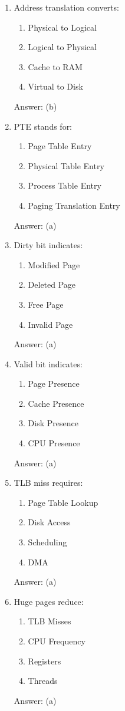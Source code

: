 \begin{enumerate}
\item Address translation converts:
\begin{enumerate}[label=(\alph*)]
\item Physical to Logical
\item Logical to Physical
\item Cache to RAM
\item Virtual to Disk
\end{enumerate}
Answer: (b)

\item PTE stands for:
\begin{enumerate}[label=(\alph*)]
\item Page Table Entry
\item Physical Table Entry
\item Process Table Entry
\item Paging Translation Entry
\end{enumerate}
Answer: (a)

\item Dirty bit indicates:
\begin{enumerate}[label=(\alph*)]
\item Modified Page
\item Deleted Page
\item Free Page
\item Invalid Page
\end{enumerate}
Answer: (a)

\item Valid bit indicates:
\begin{enumerate}[label=(\alph*)]
\item Page Presence
\item Cache Presence
\item Disk Presence
\item CPU Presence
\end{enumerate}
Answer: (a)

\item TLB miss requires:
\begin{enumerate}[label=(\alph*)]
\item Page Table Lookup
\item Disk Access
\item Scheduling
\item DMA
\end{enumerate}
Answer: (a)

\item Huge pages reduce:
\begin{enumerate}[label=(\alph*)]
\item TLB Misses
\item CPU Frequency
\item Registers
\item Threads
\end{enumerate}
Answer: (a)


\end{enumerate}
